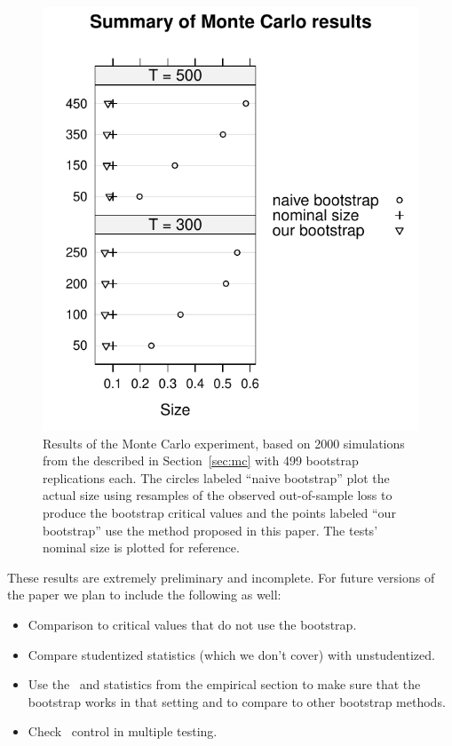 \documentclass[12pt,fleqn]{article}
\begin{document}
\begin{figure}[t]
  \includegraphics{montecarlo/west_iv.pdf}
  \caption{Results of the Monte Carlo experiment, based on 2000
    simulations from the \dgp described in Section~\ref{sec:mc} with 499
    bootstrap replications each. The circles labeled ``naive bootstrap'' plot the
    actual size
    using resamples of the observed out-of-sample loss to produce the
    bootstrap critical values and the points labeled ``our bootstrap'' use
    the method proposed in this paper. The tests' nominal size is plotted
    for reference.}
  \label{fig:1}
\end{figure}

These results are extremely preliminary and incomplete. For future
versions of the paper we plan to include the following as well:
\begin{itemize}
\item Comparison to  critical values that do not use
  the bootstrap.
\item Compare studentized statistics (which we don't cover) with
  unstudentized.
\item Use the \dgp\ and statistics from the empirical section to make
  sure that the bootstrap works in that setting and to compare to
  other bootstrap methods.
\item Check \fwe\ control in multiple testing.
\end{itemize}
\end{document}
